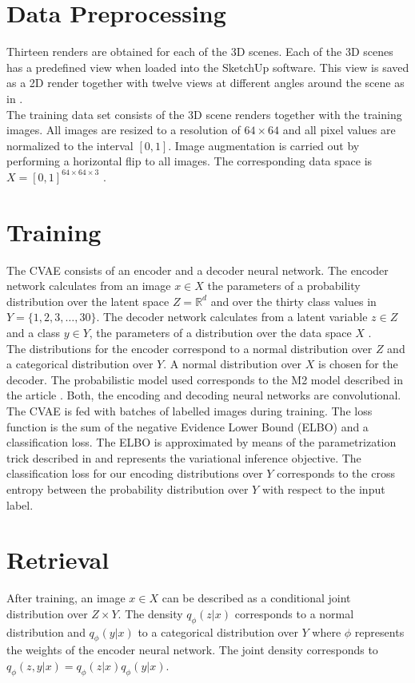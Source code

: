 \section{Data Preprocessing}
Thirteen renders are obtained for each of the 3D scenes. Each of the 3D scenes has a predefined view when loaded into the SketchUp software. This view is saved as a 2D render together with twelve views at different angles around the scene as in \cite{Su2015}.\\

The training data set consists of the 3D scene renders together with the training images. All images are resized to a resolution of $64\times64$ and all pixel values are normalized to the interval $[0,1]$. Image augmentation is carried out by performing a horizontal flip to all images. The corresponding data space is $X = [0,1]^{64\times 64 \times 3}$ . 

\section{Training}
The CVAE consists of an encoder and a decoder neural network. The encoder network calculates from an image $x\in X$ the parameters of a probability distribution over the latent space $Z = \mathbb{R}^d$ and over the thirty class values in $Y = \{1,2,3,\ldots, 30\}$. The decoder network calculates from a latent variable $z\in Z$ and a class $y\in Y$, the parameters of a distribution over the data space $X$ .\\

The distributions for the encoder correspond to a normal distribution over $Z$ and a categorical distribution over $Y$. A normal distribution over $X$ is chosen for the decoder. The probabilistic model used corresponds to the M2 model described in the article \cite{Kingma2014a}. Both, the encoding and decoding neural networks are convolutional.\\

The CVAE is fed with batches of labelled images during training. The loss function is the sum of the negative Evidence Lower Bound (ELBO) and a classification loss. The ELBO is approximated by means of the parametrization trick described in \cite{Kingma2014a, Kingma2014} and represents the variational inference objective. The classification loss for our encoding distributions over $Y$ corresponds to the cross entropy between the probability distribution over $Y$ with respect to the input label. 

\section{Retrieval}
After training, an image $x\in X$ can be described as a conditional joint distribution over $Z\times Y$. The density $q_\phi(z|x)$ corresponds to a normal distribution and $q_\phi(y|x)$ to a categorical distribution over $Y$ where $\phi$ represents the weights of the encoder neural network. The joint density corresponds to $q_\phi(z,y|x) = q_\phi(z|x) q_\phi(y|x)$.

